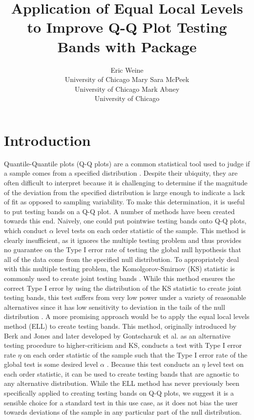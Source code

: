 \documentclass[article]{jss}
\author{Eric Weine\\University of Chicago
   \And Mary Sara McPeek\\University of Chicago
   \And Mark Abney\\University of Chicago}
\title{Application of Equal Local Levels to Improve Q-Q Plot Testing Bands with \proglang{R} Package \pkg{qqconf}}
\begin{document}
\maketitle

\section{Introduction}
Quantile-Quantile plots (Q-Q plots) are a common statistical tool used to judge if a sample comes from a specified distribution \citep{wilk_gnanadesikan_1968}. Despite their ubiquity, they are often difficult to interpret because it is challenging to determine if the magnitude of the deviation from the specified distribution is large enough to indicate a lack of fit as opposed to sampling variability. To make this determination, it is useful to put testing bands on a Q-Q plot.
\newline
\newline
A number of methods have been created towards this end. Naively, one could put pointwise testing bands onto Q-Q plots, which conduct $\alpha$ level tests on each order statistic of the sample. This method is clearly insufficient, as it ignores the multiple testing problem and thus provides no guarantee on the Type I error rate of testing the global null hypothesis that all of the data come from the specified null distribution. To appropriately deal with this multiple testing problem, the Komolgorov-Smirnov (KS) statistic is commonly used to create joint testing bands \citep{kolmogoroff1941confidence, smirnov1944approximate}. While this method ensures the correct Type I error by using the distribution of the KS statistic to create joint testing bands, this test suffers from very low power under a variety of reasonable alternatives since it has low sensitivity to deviation in the tails of the null distribution \citep{aldor2013power, berk1979goodness}. A more promising approach would be to apply the equal local levels method (ELL) to create testing bands. This method, originally introduced by Berk and Jones and later developed by Gontscharuk et al. as an alternative testing procedure to higher-criticism and KS, conducts a test with Type I error rate $\eta$ on each order statistic of the sample such that the Type I error rate of the global test is some desired level $\alpha$ \citep{berk1979goodness, gontscharuk2015intermediates, gontscharuk2016goodness, gontscharuk2017asymptotics}. Because this test conducts an $\eta$ level test on each order statistic, it can be used to create testing bands that are agnostic to any alternative distribution. While the ELL method has never previously been specifically applied to creating testing bands on Q-Q plots, we suggest it is a sensible choice for a standard test in this use case, as it does not bias the user towards deviations of the sample in any particular part of the null distribution.
\end{document}
